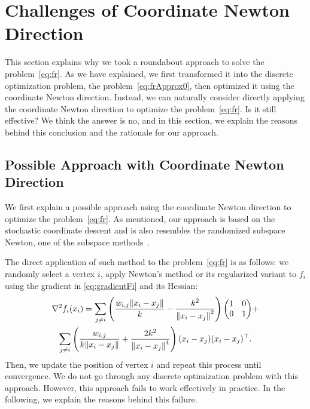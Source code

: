 \documentclass[dvipdfmx,10pt,journal,compsoc]{IEEEtran}
\begin{document}
\section{Challenges of Coordinate Newton Direction}\label{sec:challenges}

This section explains why we took a roundabout approach to solve the problem~\eqref{eq:fr}.
As we have explained, we first transformed it into the discrete optimization problem, the problem~\eqref{eq:frApprox0}, then optimized it using the coordinate Newton direction.
Instead, we can naturally consider directly applying the coordinate Newton direction to optimize the problem~\eqref{eq:fr}. Is it still effective?
We think the answer is no, and in this section, we explain the reasons behind this conclusion and the rationale for our approach.

\subsection{Possible Approach with Coordinate Newton Direction}\label{ssec:possibleApproach}

We first explain a possible approach using the coordinate Newton direction to optimize the problem~\eqref{eq:fr}.
As mentioned, our approach is based on the stochastic coordinate descent and is also resembles the randomized subspace Newton, one of the subspace methods~\cite{NEURIPS2019_bc6dc48b,
  fujiRandomizedSubspaceRegularized2022,
  cartisRandomisedSubspaceMethods2022,
  nozawaRandomizedSubspaceGradient2023,
  higuchiFastConvergenceSecondOrder2024}.

The direct application of such method to the problem~\eqref{eq:fr} is as follows: we randomly select a vertex $i$, apply Newton's method or its regularized variant to $f_i$ using the gradient in \cref{eq:gradientFi} and its Hessian:
\begin{gather*}
  \nabla^2 f_i(x_i) = \sum_{j \neq i} \left(\frac{w_{i,j}\norm{x_i - x_j}}{k} - \frac{k^2}{\norm{x_i - x_j}^2}\right) \mqty(1&0\\0&1)+ \\
  \sum_{j \neq i} \left(\frac{w_{i,j}}{k \norm{x_i - x_j}} + \frac{2k^2}{\norm{x_i - x_j}^4}\right) (x_i - x_j)(x_i - x_j)^\top.
\end{gather*}
Then, we update the position of vertex $i$ and repeat this process until convergence. We do not go through any discrete optimization problem with this approach.
However, this approach fails to work effectively in practice.
In the following, we explain the reasons behind this failure.
\end{document}

